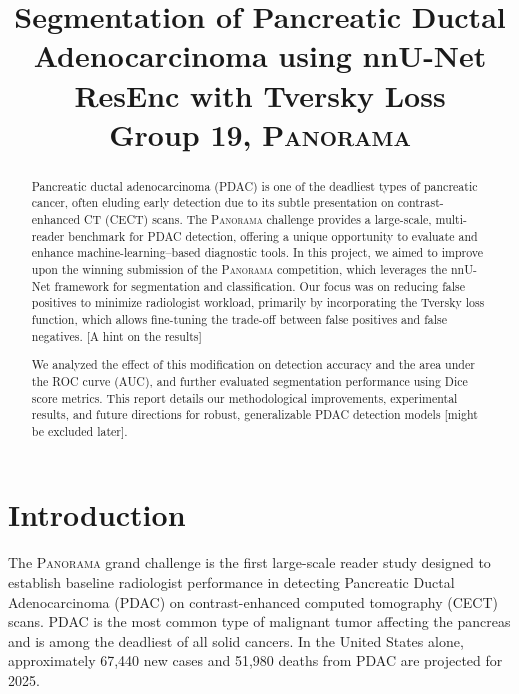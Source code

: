 \documentclass[conference]{IEEEtran}
\begin{document}
\title{Segmentation of Pancreatic Ductal Adenocarcinoma using nnU-Net ResEnc with Tversky Loss \\ {\Large Group 19,  \textsc{Panorama}}}

\author{
\and
{}
\and
{}
\and
{}
}

\maketitle

\begin{abstract}
Pancreatic ductal adenocarcinoma (PDAC) is one of the deadliest types of pancreatic cancer, often eluding early detection due to its subtle presentation on contrast-enhanced CT (CECT) scans. The \textsc{Panorama} challenge provides a large-scale, multi-reader benchmark for PDAC detection, offering a unique opportunity to evaluate and enhance machine-learning–based diagnostic tools. In this project, we aimed to improve upon the winning submission of the \textsc{Panorama} competition, which leverages the nnU-Net framework for segmentation and classification. Our focus was on reducing false positives to minimize radiologist workload, primarily by incorporating the Tversky loss function, which allows fine-tuning the trade-off between false positives and false negatives. [A hint on the results]


We analyzed the effect of this modification on detection accuracy and the area under the ROC curve (AUC), and further evaluated segmentation performance using Dice score metrics. This report details our methodological improvements, experimental results, and future directions for robust, generalizable PDAC detection models [might be excluded later].

\end{abstract}

\section{Introduction}
The \textsc{Panorama} grand challenge \cite{b5} is the first large-scale reader study designed to establish baseline radiologist performance in detecting Pancreatic Ductal Adenocarcinoma (PDAC) on contrast-enhanced computed tomography (CECT) scans. PDAC is the most common type of malignant tumor affecting the pancreas and is among the deadliest of all solid cancers. In the United States alone, approximately 67,440 new cases and 51,980 deaths from PDAC are projected for 2025\cite{b2}.
\end{document}
